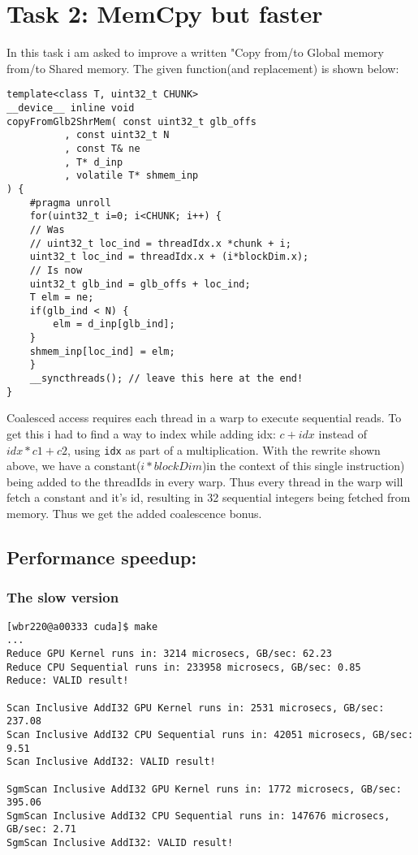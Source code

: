 \documentclass[11pt]{article}
\begin{document}
\section{Task 2: MemCpy but faster}
\label{sec:org4565838}
In this task i am asked to improve a written "Copy from/to Global memory from/to Shared memory.  
The given function(and replacement) is shown below:
\begin{verbatim}
template<class T, uint32_t CHUNK>
__device__ inline void
copyFromGlb2ShrMem( const uint32_t glb_offs
		  , const uint32_t N
		  , const T& ne
		  , T* d_inp
		  , volatile T* shmem_inp
) {
    #pragma unroll
    for(uint32_t i=0; i<CHUNK; i++) {
	// Was 
	// uint32_t loc_ind = threadIdx.x *chunk + i;
	uint32_t loc_ind = threadIdx.x + (i*blockDim.x);
	// Is now
	uint32_t glb_ind = glb_offs + loc_ind;
	T elm = ne;
	if(glb_ind < N) { 
	    elm = d_inp[glb_ind];
	}
	shmem_inp[loc_ind] = elm;
    }
    __syncthreads(); // leave this here at the end!
}
\end{verbatim}
Coalesced access requires each thread in a warp to execute sequential reads.
To get this i had to find a way to index while adding idx: \(c + idx\) instead of 
\(idx * c1 + c2\), using \texttt{idx} as part of a multiplication. With the rewrite
shown above, we have a constant(\(i*blockDim\))in the context of this single instruction) 
being added to the threadIds in every warp. Thus every thread in the warp will fetch
a constant and it's id, resulting in 32 sequential integers being fetched from
memory. Thus we get the added coalescence bonus.
\subsection{Performance speedup:}
\label{sec:org358c598}
\subsubsection{The slow version}
\label{sec:orgc435538}
\begin{verbatim}
[wbr220@a00333 cuda]$ make
...
Reduce GPU Kernel runs in: 3214 microsecs, GB/sec: 62.23
Reduce CPU Sequential runs in: 233958 microsecs, GB/sec: 0.85
Reduce: VALID result!

Scan Inclusive AddI32 GPU Kernel runs in: 2531 microsecs, GB/sec: 237.08
Scan Inclusive AddI32 CPU Sequential runs in: 42051 microsecs, GB/sec: 9.51
Scan Inclusive AddI32: VALID result!

SgmScan Inclusive AddI32 GPU Kernel runs in: 1772 microsecs, GB/sec: 395.06
SgmScan Inclusive AddI32 CPU Sequential runs in: 147676 microsecs, GB/sec: 2.71
SgmScan Inclusive AddI32: VALID result!
\end{verbatim}
\end{document}

